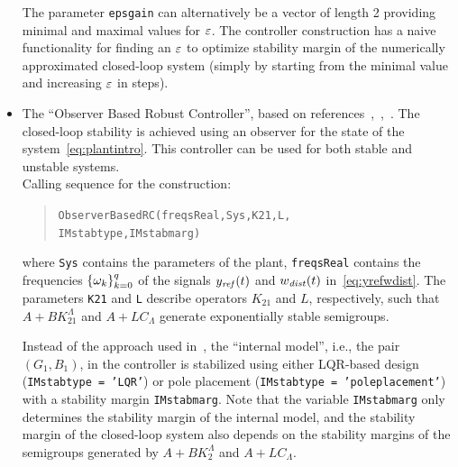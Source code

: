 \documentclass[11pt, a4paper]{amsart}
\newcommand{\CL}{C_\Lambda}
\theoremstyle{definition}
\numberwithin{equation}{section}
\newcommand{\yref}{y_{\mbox{\scriptsize\textit{ref}}}}
\newcommand{\wdist}{w_{\mbox{\scriptsize\textit{dist}}}}
\begin{document}
\begin{itemize}
     The parameter \texttt{epsgain} can alternatively be a vector of length 2 providing minimal and maximal values for $\varepsilon$. The controller construction has a naive functionality for finding an $\varepsilon$ to optimize stability margin of the numerically approximated closed-loop system (simply by starting from the minimal value and increasing $\varepsilon$ in steps). 

     \bigskip

  \item The ``Observer Based Robust Controller'', based on references~,~,~. The closed-loop stability is achieved using an observer for the state of the system~\eqref{eq:plantintro}. This controller can be used for both stable and unstable systems.\\[1ex]
      Calling sequence for the construction:\\[-1ex]
     \begin{quotation}
       \texttt{ObserverBasedRC(freqsReal,Sys,K21,L,\\ 
	 \phantom{a}\hspace{2.9cm} IMstabtype,IMstabmarg)}
     \end{quotation}
     \medskip
     where \texttt{Sys} contains the parameters of the plant, \texttt{freqsReal} contains the frequencies $\{\omega_k\}_{k=0}^q$ of the signals $\yref(t)$ and $\wdist(t)$ in~\eqref{eq:yrefwdist}.
     The parameters \texttt{K21} and \texttt{L} describe operators $K_{21}$ and $L$, respectively, such that $A+BK_{21}^\Lambda$ and $A+L\CL$ generate exponentially stable semigroups. 

     Instead of the approach used in~\cite{Pau16a}, the ``internal model'', i.e., the pair $(G_1,B_1)$, in the controller is stabilized using either LQR-based design (\texttt{IMstabtype = 'LQR'}) or pole placement (\texttt{IMstabtype = 'poleplacement'}) with a stability margin \texttt{IMstabmarg}. Note that the variable \texttt{IMstabmarg} only determines the stability margin of the internal model, and the stability margin of the closed-loop system also depends on the stability margins of the semigroups generated by $A+BK_2^\Lambda$ and $A+L\CL$.
     
     \bigskip
     

\end{itemize}
\end{document}
